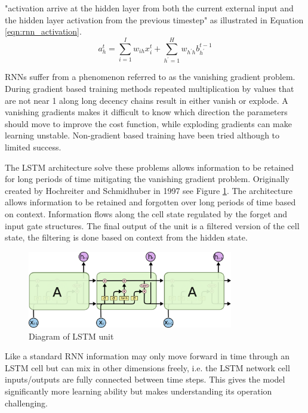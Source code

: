 \documentclass[sensors,article,submit,moreauthors,pdftex]{Definitions/mdpi}
\begin{document}
 "activation arrive at the hidden layer from both the current external input and the hidden layer activation from the previous timestep"\cite{Graves2012} as illustrated in Equation \ref{eqn:rnn_activation}.
\begin{equation}
    a_h^t = \sum_{i=1}^I w_{ih}x^t_i + \sum_{h^\prime=1}^H w_{h^\prime h} b_{h^\prime}^{t-1}
    \label{eqn:rnn_activation}
\end{equation}

RNNs suffer from a phenomenon referred to as the vanishing gradient problem. During gradient based training methods repeated multiplication  by values that are not near 1 along long decency chains result in either vanish or explode. A vanishing gradients makes it difficult to know which direction the parameters should move to improve the cost function, while exploding gradients can make learning unstable. Non-gradient based training have been tried although to limited success. \cite{Graves2012, Goodfellow2015}

The LSTM architecture solve these problems allows information to be retained for long periods of time mitigating the vanishing gradient problem. Originally created by Hochreiter and Schmidhuber in 1997\cite{Hochreiter1997} see Figure \ref{fig:lstm_unit}. The architecture allows information to be retained and forgotten over long periods of time based on context. Information flows along the cell state regulated by the forget and input gate structures. The final output of the unit is a filtered version of the cell state, the filtering is done based on context from the hidden state.\cite{Olah2015}   %
\begin{figure}[!htb]
    \centering
    \includegraphics[width=0.8\textwidth]{Figures/LSTM-chain.png}
    \caption{Diagram of LSTM unit \cite{Olah2015}}
    \label{fig:lstm_unit}
\end{figure}

Like a standard RNN information may only move forward in time through an LSTM cell but can mix in other dimensions freely, i.e. the LSTM network cell inputs/outputs are fully connected between time steps. This gives the model significantly more learning ability but makes understanding its operation challenging.
\end{document}
